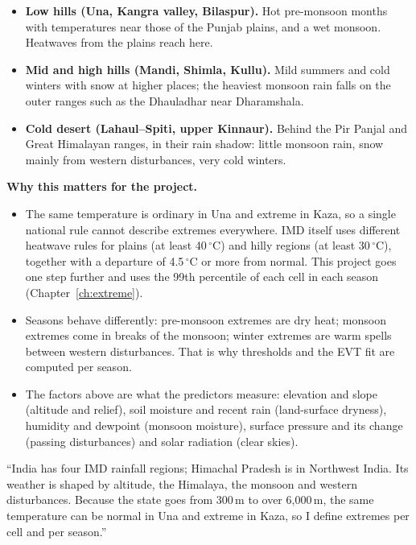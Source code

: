\begin{itemize}
\item \textbf{Low hills (Una, Kangra valley, Bilaspur).} Hot pre-monsoon months with temperatures near those of the
Punjab plains, and a wet monsoon. Heatwaves from the plains reach here.
\item \textbf{Mid and high hills (Mandi, Shimla, Kullu).} Mild summers and cold winters with snow at higher places;
the heaviest monsoon rain falls on the outer ranges such as the Dhauladhar near Dharamshala.
\item \textbf{Cold desert (Lahaul--Spiti, upper Kinnaur).} Behind the Pir Panjal and Great Himalayan ranges, in their
rain shadow: little monsoon rain, snow mainly from western disturbances, very cold winters.
\end{itemize}

\textbf{Why this matters for the project.}
\begin{itemize}
\item The same temperature is ordinary in Una and extreme in Kaza, so a single national rule cannot describe extremes
everywhere. IMD itself uses different heatwave rules for plains (at least 40\,$^\circ$C) and hilly regions (at least
30\,$^\circ$C), together with a departure of 4.5\,$^\circ$C or more from normal. This project goes
one step further and uses the 99th percentile of each cell in each season (Chapter~\ref{ch:extreme}).
\item Seasons behave differently: pre-monsoon extremes are dry heat; monsoon extremes come in breaks of the monsoon;
winter extremes are warm spells between western disturbances. That is why thresholds and the EVT fit are computed per
season.
\item The factors above are what the predictors measure: elevation and slope (altitude and relief), soil moisture and
recent rain (land-surface dryness), humidity and dewpoint (monsoon moisture), surface pressure and its change
(passing disturbances) and solar radiation (clear skies).
\end{itemize}


\begin{sayit}
``India has four IMD rainfall regions; Himachal Pradesh is in Northwest India. Its weather is shaped by altitude, the
Himalaya, the monsoon and western disturbances. Because the state goes from 300\,m to over 6,000\,m, the same
temperature can be normal in Una and extreme in Kaza, so I define extremes per cell and per season.''
\end{sayit}
